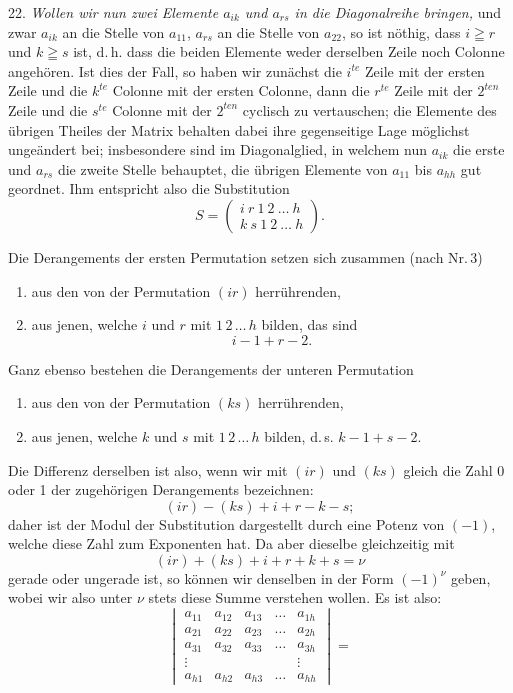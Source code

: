 \documentclass[11pt]{article}
\providecommand{\weberpage}[1]{}
\begin{document}
\weberpage{29}
22. \textit{Wollen wir nun zwei Elemente $a_{ik}$ und $a_{rs}$ in die Diagonalreihe
bringen,} und zwar $a_{ik}$ an die Stelle von $a_{11}$, $a_{rs}$ an die Stelle von
$a_{22}$, so ist n\"othig, dass $i \geqq r$ und $k \geqq s$ ist, d.\,h. dass die beiden
Elemente weder derselben Zeile noch Colonne angeh\"oren. Ist dies der Fall, so haben
wir zun\"achst die $i^{te}$ Zeile mit der ersten Zeile und die $k^{te}$ Colonne mit
der ersten Colonne, dann die $r^{te}$ Zeile mit der $2^{ten}$ Zeile und die $s^{te}$
Colonne mit der $2^{ten}$ cyclisch zu vertauschen; die Elemente des \"ubrigen Theiles
der Matrix behalten dabei ihre gegenseitige Lage m\"oglichst unge\"andert bei;
insbesondere sind im Diagonalglied, in welchem nun $a_{ik}$ die erste und $a_{rs}$
die zweite Stelle behauptet, die \"ubrigen Elemente von $a_{11}$ bis $a_{hh}$ gut
geordnet. Ihm entspricht also die Substitution
\[
S = \begin{pmatrix} i\ r\ 1\ 2\ \dots\ h \\ k\ s\ 1\ 2\ \dots\ h \end{pmatrix}.
\]

Die Derangements der ersten Permutation setzen sich zusammen (nach Nr.\,3)
\begin{enumerate}
\item[1)] aus den von der Permutation $(ir)$ herr\"uhrenden,
\item[2)] aus jenen, welche $i$ und $r$ mit $1\,2\,\dots\,h$ bilden, das sind
\[
i - 1 + r - 2.
\]
\end{enumerate}
Ganz ebenso bestehen die Derangements der unteren Permutation
\begin{enumerate}
\item[1)] aus den von der Permutation $(ks)$ herr\"uhrenden,
\item[2)] aus jenen, welche $k$ und $s$ mit $1\,2\,\dots\,h$ bilden, d.\,s.
$k - 1 + s - 2$.
\end{enumerate}
Die Differenz derselben ist also, wenn wir mit $(ir)$ und $(ks)$ gleich die Zahl
0 oder 1 der zugeh\"origen Derangements bezeichnen:
\[
(ir) - (ks) + i + r - k - s;
\]
daher ist der Modul der Substitution dargestellt durch eine Potenz von $(-1)$,
welche diese Zahl zum Exponenten hat. Da aber dieselbe gleichzeitig mit
\[
(ir) + (ks) + i + r + k + s = \nu
\]
gerade oder ungerade ist, so k\"onnen wir denselben in der Form $(-1)^{\nu}$
geben, wobei wir also unter $\nu$ stets diese Summe verstehen wollen. Es ist also:
\[
\begin{vmatrix}
a_{11} & a_{12} & a_{13} & \dots & a_{1h} \\
a_{21} & a_{22} & a_{23} & \dots & a_{2h} \\
a_{31} & a_{32} & a_{33} & \dots & a_{3h} \\
\vdots & & & & \vdots \\
a_{h1} & a_{h2} & a_{h3} & \dots & a_{hh}
\end{vmatrix}
=
\]
\end{document}
